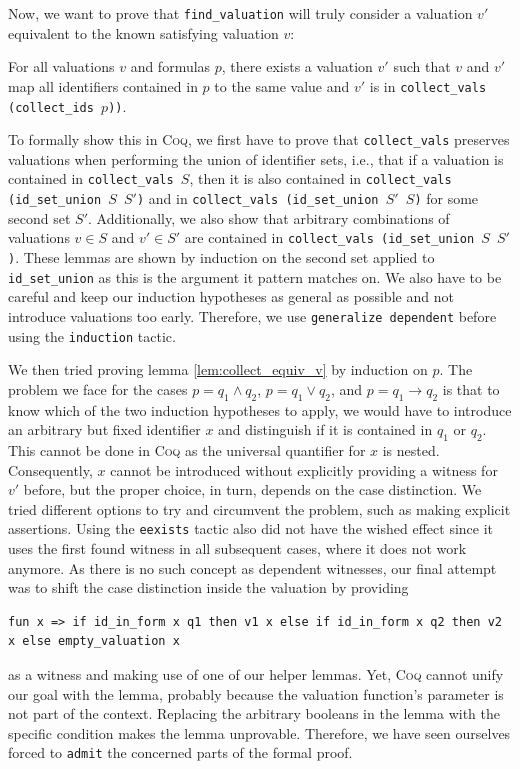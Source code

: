 Now, we want to prove that \texttt{find\_valuation} will truly consider a valuation $v'$ equivalent to the known satisfying valuation $v$:
\begin{lemma}\label{lem:collect_equiv_v}
    For all valuations $v$ and formulas $p$, there exists a valuation $v'$ such that $v$ and $v'$ map all identifiers contained in $p$ to the same value and $v'$ is in \texttt{collect\_vals (collect\_ids $p$))}.
\end{lemma}
To formally show this in \textsc{Coq}, we first have to prove that \texttt{collect\_vals} preserves valuations when performing the union of identifier sets, i.e., that if a valuation is contained in \texttt{collect\_vals $S$}, then it is also contained in \texttt{collect\_vals (id\_set\_union $S$ $S'$)} and in \texttt{collect\_vals (id\_set\_union $S'$ $S$)} for some second set $S'$.
Additionally, we also show that arbitrary combinations of valuations $v \in S$ and $v' \in S'$ are contained in \texttt{collect\_vals (id\_set\_union $S$ $S'$)}.
These lemmas are shown by induction on the second set applied to \texttt{id\_set\_union} as this is the argument it pattern matches on.
We also have to be careful and keep our induction hypotheses as general as possible and not introduce valuations too early.
Therefore, we use \texttt{generalize dependent} before using the \texttt{induction} tactic.

We then tried proving lemma \ref{lem:collect_equiv_v} by induction on $p$.
The problem we face for the cases $p = q_1 \land q_2$, $p = q_1 \lor q_2$, and $p = q_1 \rightarrow q_2$ is that to know which of the two induction hypotheses to apply, we would have to introduce an arbitrary but fixed identifier $x$ and distinguish if it is contained in $q_1$ or $q_2$.
This cannot be done in \textsc{Coq} as the universal quantifier for $x$ is nested.
Consequently, $x$ cannot be introduced without explicitly providing a witness for $v'$ before, but the proper choice, in turn, depends on the case distinction.
We tried different options to try and circumvent the problem, such as making explicit assertions.
Using the \texttt{eexists} tactic also did not have the wished effect since it uses the first found witness in all subsequent cases, where it does not work anymore.
As there is no such concept as dependent witnesses, our final attempt was to shift the case distinction inside the valuation by providing 
\begin{lstlisting}[language=coq]
fun x => if id_in_form x q1 then v1 x else if id_in_form x q2 then v2 x else empty_valuation x
\end{lstlisting}
as a witness and making use of one of our helper lemmas.
Yet, \textsc{Coq} cannot unify our goal with the lemma, probably because the valuation function's parameter is not part of the context.
Replacing the arbitrary booleans in the lemma with the specific condition makes the lemma unprovable.
Therefore, we have seen ourselves forced to \texttt{admit} the concerned parts of the formal proof.

